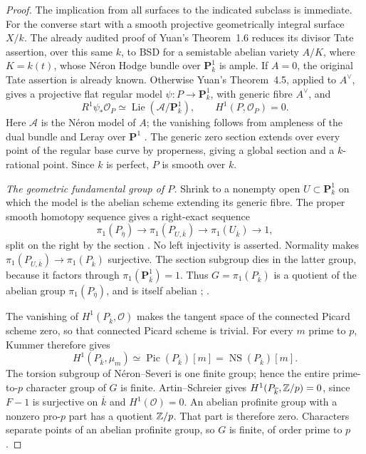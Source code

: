 \begin{proof}
The implication from all surfaces to the indicated subclass is
immediate.  For the converse start with a smooth projective
geometrically integral surface \(X/k\).  The already audited
proof of Yuan's Theorem~1.6 reduces its divisor Tate assertion,
over this same \(k\), to BSD for a semistable abelian variety
\(A/K\), where \(K=k(t)\), whose N\'eron Hodge bundle over
\(\mathbf P^1_k\) is ample.  If \(A=0\), the original Tate
assertion is already known.  Otherwise Yuan's Theorem~4.5,
applied to \(A^\vee\), gives a projective flat regular model
\(\psi:P\to\mathbf P^1_k\), with generic fibre \(A^\vee\),
and
\[
 R^1\psi_*\mathcal O_P\simeq
       \operatorname{Lie}(\mathcal A/\mathbf P^1_k),
 \qquad H^1(P,\mathcal O_P)=0.
\]
Here \(\mathcal A\) is the N\'eron model of \(A\); the
vanishing follows from ampleness of the dual bundle and Leray
over \(\mathbf P^1\)
\citep[Theorem~4.5 and Section~4.2, author pp.~33--36]{DYuan2021Hodge}.
The generic zero section extends over every point of the regular
base curve by properness, giving a global section and a
\(k\)-rational point.  Since \(k\) is perfect, \(P\) is smooth
over \(k\).

\emph{The geometric fundamental group of \(P\).}
Shrink to a nonempty open \(U\subset\mathbf P^1_k\) on which
the model is the abelian scheme extending its generic fibre.
The proper smooth homotopy sequence gives a right-exact sequence
\[
 \pi_1(P_{\overline\eta})\longrightarrow
 \pi_1(P_{U,\overline k})\longrightarrow
 \pi_1(U_{\overline k})\longrightarrow1,
\]
split on the right by the section
\citep[Expos\'e~X, Theorem~1.3 and Corollary~1.4,
pp.~202--203]{c_sga1_2003}.
No left injectivity is asserted.  Normality makes
\(\pi_1(P_{U,\overline k})\to\pi_1(P_{\overline k})\)
surjective.  The section subgroup dies in the latter group,
because it factors through \(\pi_1(\mathbf P^1_{\overline k})=1\).
Thus
\(G=\pi_1(P_{\overline k})\) is a quotient of the abelian
group \(\pi_1(P_{\overline\eta})\), and is itself abelian
\citep[Lemma~58.10.7]{BStacksFundamentalGroups};
\citep[Expos\'e~XI, Section~2 and Theorem~2.1,
pp.~221--222]{c_sga1_2003}.

The vanishing of \(H^1(P_{\overline k},\mathcal O)\) makes
the tangent space of the connected Picard scheme zero, so that
connected Picard scheme is trivial.  For every \(m\) prime to
\(p\), Kummer therefore gives
\[
 H^1(P_{\overline k},\mu_m)
       \simeq\operatorname{Pic}(P_{\overline k})[m]
       =\operatorname{NS}(P_{\overline k})[m].
\]
The torsion subgroup of N\'eron--Severi is one finite group;
hence the entire prime-to-\(p\) character group of \(G\) is
finite.  Artin--Schreier gives
\(H^1(P_{\overline k},\mathbb Z/p)=0\), since \(F-1\) is
surjective on \(\overline k\) and \(H^1(\mathcal O)=0\).
An abelian profinite group with a nonzero pro-\(p\) part has a
quotient \(\mathbb Z/p\).  That part is therefore zero.  Characters
separate points of an abelian profinite group, so \(G\) is
finite, of order prime to \(p\)
\citep[Expos\'e~XI, Proposition~6.4, Corollary~6.6 and its
following paragraph, pp.~234--235; Propositions~6.7--6.8 and
Corollary~6.10, pp.~236--237]{c_sga1_2003}.


\end{proof}
